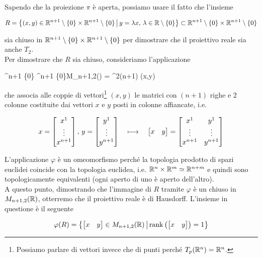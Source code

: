 Sapendo che la proiezione $ \pi $ è aperta, possiamo usare il fatto che l'insieme

\begin{equation}
	R = \left\{ (x,y) \in \mathbb{R}^{n+1} \setminus \{0\} \times \mathbb{R}^{n+1} \setminus \{0\} \, \middle| \, y=\lambda x, \, \lambda \in \mathbb{R} \setminus \{0\} \right\} \subset \mathbb{R}^{n+1} \setminus \{0\} \times \mathbb{R}^{n+1} \setminus \{0\}
\end{equation}

sia chiuso in $ \mathbb{R}^{n+1} \setminus \{0\} \times \mathbb{R}^{n+1} \setminus \{0\} $ per dimostrare che il proiettivo reale sia anche $ T_{2} $. \\
Per dimostrare che $ R $ sia chiuso, consideriamo l'applicazione

\map{\varphi}
	{\R^{n+1} \setminus \{0\} \times \R^{n+1} \setminus \{0\}}{M_{n+1,2}(\R) = \R^{2(n+1)}}
	{(x,y)}{}

che associa alle coppie di vettori\footnote{%
	Possiamo parlare di vettori invece che di punti perché $ T_{p}(\mathbb{R}^{n}) = \mathbb{R}^{n} $.%
} $ (x,y) $ le matrici con $ (n+1) $ righe e $ 2 $ colonne costituite dai vettori $ x $ e $ y $ posti in colonne affiancate, i.e.

\begin{equation}
	x = \bmqty{x^{1} \\ \vdots \\ x^{n+1}} , \, y = \bmqty{y^{1} \\ \vdots \\ y^{n+1}} %
	\quad \longmapsto \quad %
	\bmqty{x & y} = \bmqty{x^{1} & y^{1} \\ \vdots & \vdots \\ x^{n+1} & y^{n+1}}
\end{equation}

L'applicazione $ \varphi $ è un omeomorfismo perché la topologia prodotto di spazi euclidei coincide con la topologia euclidea, i.e. $ \mathbb{R}^{n} \times \mathbb{R}^{m} \simeq \mathbb{R}^{n+m} $ e quindi sono topologicamente equivalenti (ogni aperto di uno è aperto dell'altro). \\
A questo punto, dimostrando che l'immagine di $ R $ tramite $ \varphi $ è un chiuso in $ M_{n+1,2}(\mathbb{R}) $, otterremo che il proiettivo reale è di Hausdorff. L'insieme in questione è il seguente

\begin{equation}
	\varphi(R) = \left\{ \bmqty{x & y} \in M_{n+1,2}(\R) \st \rank \left( \bmqty{x & y} \right) = 1 \right\}
\end{equation}

